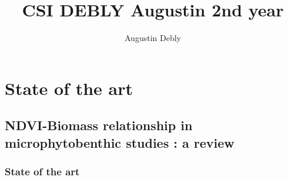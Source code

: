 \documentclass[
  letterpaper,
  DIV=11,
  numbers=noendperiod]{scrartcl}
\title{CSI DEBLY Augustin 2nd year}
\author{Augustin Debly}
\date{}
\begin{document}
\maketitle

\section{State of the art}\label{state-of-the-art}

\subsection{NDVI-Biomass relationship in microphytobenthic studies : a
review}\label{ndvi-biomass-relationship-in-microphytobenthic-studies-a-review}

\subsubsection{State of the art}\label{state-of-the-art-1}

\usepackage{multirow}
\usepackage[table,xcdraw]{xcolor}
\end{document}
